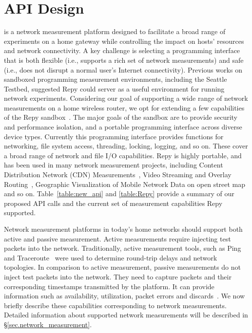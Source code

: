 \section{API Design}
\sysname is a network measurement platform designed to facilitate a broad range of experiments on a home gateway while controlling the impact on hosts' resources and network connectivity. A key challenge is selecting a programming interface that is both flexible (i.e., supports a rich set of network measurements) and safe (i.e., does not disrupt a normal user's Internet connectivity). Previous works on sandboxed programming measurement environments, including the Seattle Testbed, suggested Repy could server as a useful environment for running network experiments. Considering our goal of supporting a wide range of network measurements on a home wireless router, we opt for extending a few capabilities of the Repy sandbox~\cite{cappos2010retaining}. The major goals of the sandbox are to provide security and performance isolation, and a portable programming interface across diverse device types. Currently this programming interface provides functions for networking, file system access, threading, locking, logging, and so on. These cover a broad range of network and file I/O capabilities. Repy is highly portable, and has been used in many network measurement projects, including Content Distribution Network (CDN) Measurements~\cite{rafetseder2011exploring}, Video Streaming and Overlay Routing~\cite{eisl2011service}, Geographic Visualization of Mobile Network Data on open street map~\cite{open3gmap} and so on. Table~\ref{table:new_api} and \ref{table:Repy} provide a summary of our proposed API calls and the current set of measurement capabilities Repy supported. 

Network measurement platforms in today's home networks should support both active and passive measurement. Active measurements require injecting test packets into the network. Traditionally, active measurement tools, such as Ping~\cite{ping} and Traceroute~\cite{traceroute} were used to determine round-trip delays and network topologies. In comparison to active measurement, passive measurements do not inject test packets into the network. They need to capture packets and their corresponding timestamps transmitted by the platform. It can provide information such as availability, utilization, packet errors and discards~\cite{calyamactive}. We now briefly describe these capabilities corresponding to network measurements. Detailed information about supported network measurements will be described in \S{\ref{sec.network_measurement}}.

